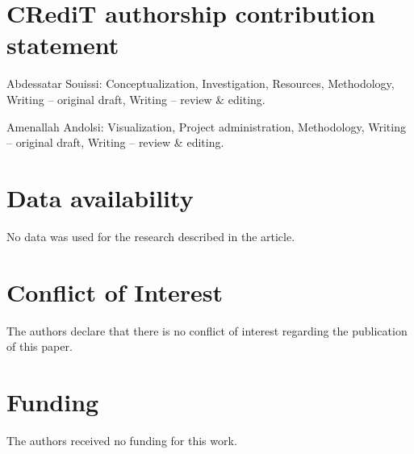 \documentclass[11pt,a4paper]{article}
\begin{document}
\section*{CRediT authorship contribution statement}

Abdessatar Souissi: Conceptualization, Investigation, Resources, Methodology, Writing – original draft, Writing – review \& editing.

Amenallah Andolsi: Visualization, Project administration, Methodology, Writing – original draft, Writing – review \& editing.



\section*{Data availability}

No data was used for the research described in the article.

\section*{Conflict of Interest}
The authors declare that there is no conflict of interest regarding the publication of this paper.

\section*{Funding}
The authors received no funding for this work.
\end{document}
